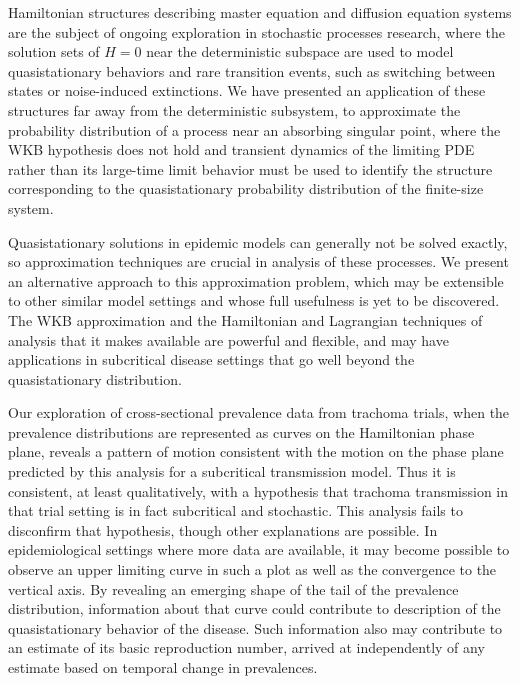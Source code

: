 \documentclass[review]{elsarticle}
\begin{document}
Hamiltonian structures describing master equation and diffusion equation
systems are the subject
of ongoing exploration in stochastic processes research, where
the solution sets of $H=0$ near the deterministic subspace are
used to model quasistationary behaviors and rare transition events,
such as switching between states or noise-induced extinctions.
We have presented an application of 
these structures far away from the deterministic subsystem,
to approximate the
probability distribution of a process near an absorbing singular point,
where the WKB hypothesis does not hold and transient dynamics of
the limiting PDE
rather than its large-time limit behavior must be used to
identify the structure corresponding to the
quasistationary probability distribution of the finite-size system.

Quasistationary solutions in epidemic models can generally not be solved
exactly, so approximation techniques are crucial in analysis of
these processes.
We present an alternative approach to this approximation
problem, which may be extensible to other similar model settings
and whose full usefulness is yet to be discovered.
The WKB approximation and the Hamiltonian and
Lagrangian techniques
of analysis that it makes available are powerful and flexible,
and may have applications in subcritical disease settings that go
well beyond the quasistationary distribution.

Our exploration of cross-sectional prevalence data from trachoma trials, 
when the prevalence distributions are 
represented as curves on the Hamiltonian phase plane,
reveals a pattern of motion consistent with the motion on the
phase plane predicted by this analysis for a subcritical
transmission model. Thus it is consistent, at least qualitatively,
with a hypothesis that trachoma transmission in that trial setting
is in fact subcritical and stochastic.
This analysis fails to disconfirm that hypothesis,
though other explanations are possible.
In epidemiological settings where more data are available, it
may become possible to observe an upper limiting curve
in such a plot as well as the convergence to the vertical axis.
By revealing an emerging shape of the tail of the prevalence
distribution, information about that curve could contribute
to description of
the quasistationary behavior of the disease.
Such information also may contribute to
an estimate of its basic reproduction number, arrived at
independently of any estimate based on temporal change
in prevalences.
\end{document}
